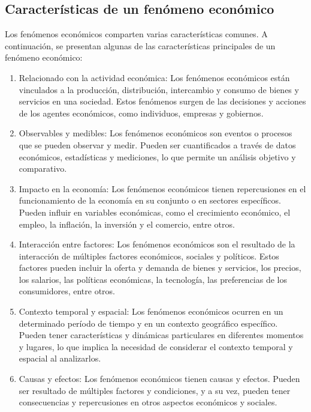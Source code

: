 \documentclass[
  jou,
  floatsintext,
  longtable,
  a4paper,
  nolmodern,
  notxfonts,
  notimes,
  12pt,
  colorlinks=true,linkcolor=blue,citecolor=blue,urlcolor=blue]{apa7}
\begin{document}
\subsection{Características de un fenómeno
económico}\label{caracteruxedsticas-de-un-fenuxf3meno-econuxf3mico}

Los fenómenos económicos comparten varias características comunes. A
continuación, se presentan algunas de las características principales de
un fenómeno económico:

\begin{enumerate}
\def\labelenumi{\arabic{enumi}.}
\item
  Relacionado con la actividad económica: Los fenómenos económicos están
  vinculados a la producción, distribución, intercambio y consumo de
  bienes y servicios en una sociedad. Estos fenómenos surgen de las
  decisiones y acciones de los agentes económicos, como individuos,
  empresas y gobiernos.
\item
  Observables y medibles: Los fenómenos económicos son eventos o
  procesos que se pueden observar y medir. Pueden ser cuantificados a
  través de datos económicos, estadísticas y mediciones, lo que permite
  un análisis objetivo y comparativo.
\item
  Impacto en la economía: Los fenómenos económicos tienen repercusiones
  en el funcionamiento de la economía en su conjunto o en sectores
  específicos. Pueden influir en variables económicas, como el
  crecimiento económico, el empleo, la inflación, la inversión y el
  comercio, entre otros.
\item
  Interacción entre factores: Los fenómenos económicos son el resultado
  de la interacción de múltiples factores económicos, sociales y
  políticos. Estos factores pueden incluir la oferta y demanda de bienes
  y servicios, los precios, los salarios, las políticas económicas, la
  tecnología, las preferencias de los consumidores, entre otros.
\item
  Contexto temporal y espacial: Los fenómenos económicos ocurren en un
  determinado período de tiempo y en un contexto geográfico específico.
  Pueden tener características y dinámicas particulares en diferentes
  momentos y lugares, lo que implica la necesidad de considerar el
  contexto temporal y espacial al analizarlos.
\item
  Causas y efectos: Los fenómenos económicos tienen causas y efectos.
  Pueden ser resultado de múltiples factores y condiciones, y a su vez,
  pueden tener consecuencias y repercusiones en otros aspectos
  económicos y sociales.
\end{enumerate}
\end{document}
